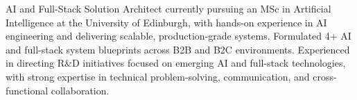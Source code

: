 

\begin{cvparagraph}

AI and Full-Stack Solution Architect currently pursuing an MSc in Artificial Intelligence at the University of Edinburgh, with hands-on experience in AI engineering and delivering scalable, production-grade systems. Formulated 4+ AI and full-stack system blueprints across B2B and B2C environments. Experienced in directing R\&D initiatives focused on emerging AI and full-stack technologies, with strong expertise in technical problem-solving, communication, and cross-functional collaboration.
\end{cvparagraph}